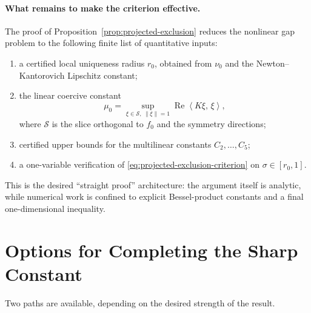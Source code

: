 \documentclass[12pt]{article}
\theoremstyle{definition}
\theoremstyle{remark}
\newcommand{\norm}[1]{\left\|#1\right\|}
\newcommand{\ip}[2]{\left\langle #1,\, #2\right\rangle}
\newcommand{\re}{\operatorname{Re}}
\begin{document}
\paragraph{What remains to make the criterion effective.}
The proof of Proposition~\ref{prop:projected-exclusion} reduces the
nonlinear gap problem to the following finite list of quantitative inputs:
\begin{enumerate}[leftmargin=2em]
  \item a certified local uniqueness radius \(r_0\), obtained from
    \(\nu_0\) and the Newton--Kantorovich Lipschitz constant;
  \item the linear coercive constant
    \[
      \mu_0=\sup_{\xi\in\mathcal S,\ \norm{\xi}=1}\re\ip{K\xi}{\xi},
    \]
    where \(\mathcal S\) is the slice orthogonal to \(f_0\) and the
    symmetry directions;
  \item certified upper bounds for the multilinear constants
    \(C_2,\ldots,C_5\);
  \item a one-variable verification of
    \eqref{eq:projected-exclusion-criterion} on
    \(\sigma\in[r_0,1]\).
\end{enumerate}
This is the desired ``straight proof'' architecture: the argument itself is
analytic, while numerical work is confined to explicit Bessel-product
constants and a final one-dimensional inequality.


\section{Options for Completing the Sharp Constant}

Two paths are available, depending on the desired strength of the result.
\end{document}
